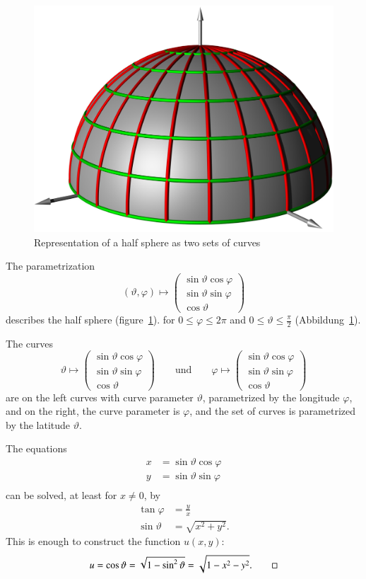 \begin{beispiel}
\begin{figure}
\centering
\includegraphics[width=0.8\hsize]{../common/3d/kugel.jpg}
\caption{Representation of a half sphere as two sets of curves
\label{quasilinear:kugel}}
\end{figure}
The parametrization
\[
(\vartheta,\varphi)\mapsto
\begin{pmatrix}
\sin\vartheta\cos\varphi\\
\sin\vartheta\sin\varphi\\
\cos\vartheta
\end{pmatrix}
\]
describes the half sphere (figure~\ref{quasilinear:kugel}).
for $0\le\varphi\le 2\pi$ and $0\le \vartheta\le \frac{\pi}2$
(Abbildung~\ref{quasilinear:kugel}).

The curves
\[
\vartheta\mapsto
\begin{pmatrix}
\sin\vartheta\cos\varphi\\
\sin\vartheta\sin\varphi\\
\cos\vartheta
\end{pmatrix}
\qquad
\text{und}
\qquad
\varphi\mapsto
\begin{pmatrix}
\sin\vartheta\cos\varphi\\
\sin\vartheta\sin\varphi\\
\cos\vartheta
\end{pmatrix}
\]
are on the left curves with curve parameter $\vartheta$, parametrized
by the longitude $\varphi$, and on the right, the curve parameter is
$\varphi$, and the set of curves is parametrized by the latitude $\vartheta$.

The equations
\begin{align*}
x&=\sin\vartheta\cos\varphi\\
y&=\sin\vartheta\sin\varphi\\
\end{align*}
can be solved, at least for $x\ne 0$, by
\begin{align*}
\tan\varphi&=\frac{y}{x}\\
\sin\vartheta &=\sqrt{x^2+y^2}.
\end{align*}
This is enough to construct the function $u(x,y)$:
\[
u=\cos\vartheta=\sqrt{1-\sin^2\vartheta}=\sqrt{1-x^2-y^2}.
\qedhere
\]
\end{beispiel}

